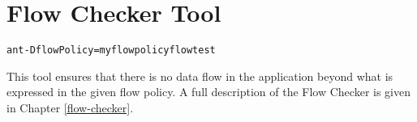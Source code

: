 \section{Flow Checker Tool\label{sec:checkertool}}

\begin{alltt}
ant -DflowPolicy=myflowpolicy flow test
\end{alltt}

This tool ensures that there is no data flow in the application beyond what is expressed in the given flow policy.  A full description of the Flow Checker is given in Chapter \ref{flow-checker}. 


